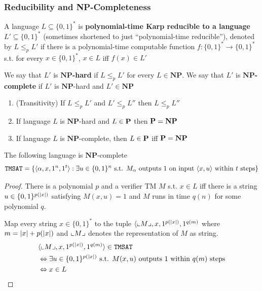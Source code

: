 \documentclass[11pt]{article}
\def \NP {\textbf{NP}}
\def \NP {\textbf{NP}}
\def \TMSAT {\texttt{TMSAT}}
\begin{document}
\subsubsection{Reducibility and NP-Completeness}
\label{sec:org0725b0e}
\begin{definition}[]
A language \(L\subseteq\{0,1\}^*\) is \textbf{polynomial-time Karp reducible to a
language} \(L'\subseteq\{0,1\}^*\) (sometimes shortened to just ``polynomial-time reducible''), denoted
by \(L\le_p L'\) if there is a polynomial-time
computable function \(f:\{0,1\}^*\to\{0,1\}^*\) s.t. for every \(x\in\{0,1\}^*\),
\(x\in L\) iff \(f(x)\in L'\)

We say that \(L'\) is \textbf{\(\NP\)-hard} if \(L\le_pL'\) for every \(L\in\NP\). We say that \(L'\)
is \textbf{\(\NP\)-complete} if \(L'\) is \(\NP\)-hard and \(L'\in\NP\)
\end{definition}

\begin{theorem}[]
\begin{enumerate}
\item (Transitivity) If \(L\le_pL'\) and \(L'\le_pL''\) then \(L\le_pL''\)
\item If language \(L\) is \(\NP\)-hard and \(L\in\operatorname{\textbf{P}}\) then \(\bP=\NP\)
\item If language \(L\) is \(\NP\)-complete, then \(L\in\operatorname{\textbf{P}}\) iff \(\bP=\NP\)
\end{enumerate}
\end{theorem}

\begin{theorem}[]
The following language is \(\NP\)-complete
    \begin{equation*}
\TMSAT=\{\la\alpha,x,1^n,1^t\ra:\exists u\in\{0,1\}^n\text{ s.t. }M_\alpha\text{ outputs }1
\text{ on input }\la x,u\ra\text{ within }t\text{ steps}\}
    \end{equation*}
\end{theorem}

\begin{proof}
There is a polynomial \(p\) and a verifier TM \(M\) s.t. \(x\in L\) iff there is a
string \(u\in\{0,1\}^{p(\abs{x})}\) satisfying \(M(x,u)=1\) and \(M\) runs in time \(q(n)\) for
some polynomial \(q\).

Map every string \(x\in\{0,1\}^*\) to the tuple \(\la\lcorner{M},x,1^{p(\abs{x})},1^{q(m)}\)
where \(m=\abs{x}+p(\abs{x})\) and \(\llcorner M \lrcorner\) denotes the representation of \(M\) as
string.
    \begin{align*}
&\la\lcorner{M},x,1^{p(\abs{x})},1^{q(m)}\ra\in\TMSAT\\
&\Leftrightarrow\exists u\in\{0,1\}^{p(\abs{x})}\text{ s.t. }M(x,u)\text{ outputs 1 within }q(m)\text{ steps}\\
&\Leftrightarrow x\in L
    \end{align*}
\end{proof}
\end{document}
